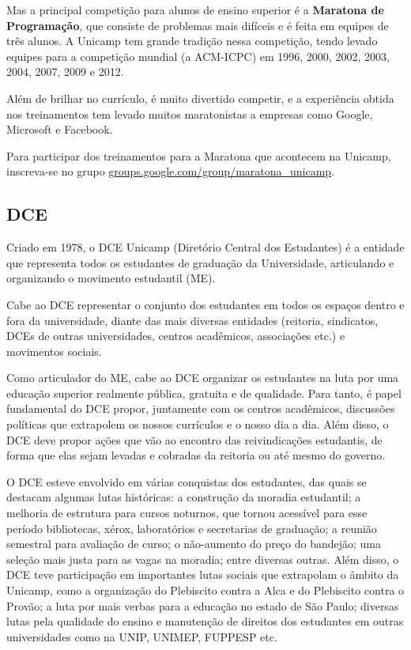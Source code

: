 Mas a principal competição para alunos de ensino superior é a \textbf{Maratona
de Programação}, que consiste de problemas mais difíceis e é feita em equipes de
três alunos. A Unicamp tem grande tradição nessa competição, tendo levado
equipes para a competição mundial (a ACM-ICPC) em 1996, 2000, 2002, 2003, 2004,
2007, 2009 e 2012.

Além de brilhar no currículo, é muito divertido competir, e a experiência obtida
nos treinamentos tem levado muitos maratonistas a empresas como Google,
Microsoft e Facebook.

Para participar dos treinamentos para a Maratona que acontecem na Unicamp,
inscreva-se no grupo \url{groups.google.com/group/maratona_unicamp}.

\subsection{DCE}

Criado em 1978, o DCE Unicamp (Diretório Central dos Estudantes) é a entidade
que representa todos os estudantes de graduação da Universidade, articulando e
organizando o movimento estudantil (ME).

Cabe ao DCE representar o conjunto dos estudantes em todos os espaços dentro e
fora da universidade, diante das mais diversas entidades (reitoria, sindicatos,
DCEs de outras universidades, centros acadêmicos, associações etc.) e movimentos
sociais.

Como articulador do ME, cabe ao DCE organizar os estudantes na luta por uma
educação superior realmente pública, gratuita e de qualidade. Para tanto, é
papel fundamental do DCE propor, juntamente com os centros acadêmicos,
discussões políticas que extrapolem os nossos currículos e o nosso dia a dia.
Além disso, o DCE deve propor ações que vão ao encontro das reivindicações
estudantis, de forma que elas sejam levadas e cobradas da reitoria ou até mesmo
do governo.

O DCE esteve envolvido em várias conquistas dos estudantes, das quais se
destacam algumas lutas históricas: a construção da moradia estudantil; a
melhoria de estrutura para cursos noturnos, que tornou acessível para esse
período bibliotecas, xérox, laboratórios e secretarias de graduação; a reunião
semestral para avaliação de curso; o não-aumento do preço do bandejão; uma
seleção mais justa para as vagas na moradia; entre diversas outras. Além disso,
o DCE teve participação em importantes lutas sociais que extrapolam o âmbito da
Unicamp, como a organização do Plebiscito contra a Alca e do Plebiscito contra o
Provão; a luta por mais verbas para a educação no estado de São Paulo; diversas
lutas pela qualidade do ensino e manutenção de direitos dos estudantes em outras
universidades como na UNIP, UNIMEP, FUPPESP etc.

